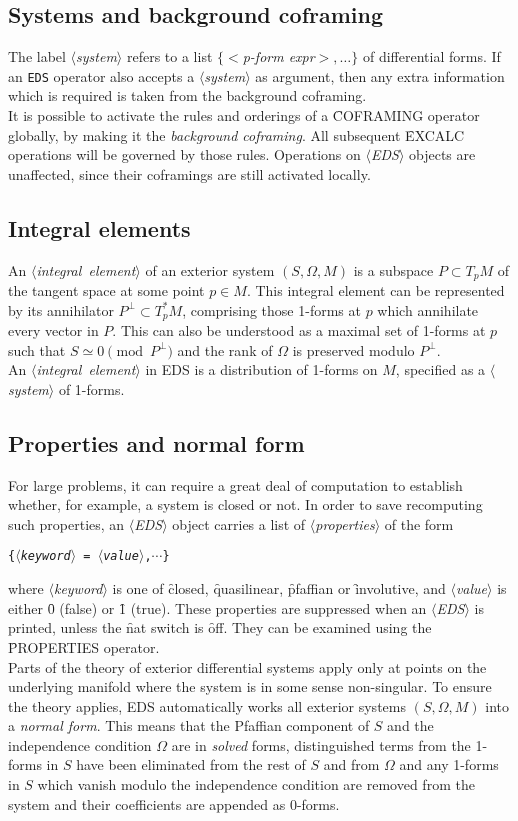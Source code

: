 \documentclass[11pt,letterpaper]{book}
\makeatletter
\newcommand{\underscore}{\_}
\newcommand{\ttindex}[1]{{\renewcommand{\_}{\protect\underscore}%
                          \index{#1@{\tt #1}}}}
\newcommand{\meta}[1]{\mbox{$\langle$\it#1\/$\rangle$}}
\makeatother
\begin{document}
\subsection{Systems and background coframing}
The label \meta{system} refers to a list $\{<${\it p-form expr}$>,\ldots\}$ of
differential forms. If an {\tt EDS} operator also accepts a \meta{system} as
argument, then any extra information which is required is taken from the
background coframing. \\
It is possible to activate the rules and orderings of a \f{COFRAMING} operator
globally, by making it the {\it background coframing}. All subsequent \f{EXCALC}
\ttindex{EXCALC} operations will be governed by those rules. Operations on
\meta{EDS} objects are unaffected, since their coframings are still activated
locally.

\subsection{Integral elements}
An \meta{integral element} of an exterior system $(S,\Omega,M)$ is a subspace
$P \subset T_pM$ of the tangent space at some point $p \in M$. This integral
element can be represented by its annihilator $P^\perp \subset T^*_pM$, comprising
those 1-forms at $p$ which annihilate every vector in $P$. This can also be understood
as a maximal set of 1-forms at $p$ such that $S \simeq 0 \pmod{P^\perp}$ and the
rank of $\Omega$ is preserved modulo $P^\perp$. \\
An \meta{integral element} in EDS is a distribution of 1-forms on $M$,
specified as a \meta{system} of 1-forms.

\subsection{Properties and normal form}
For large problems, it can require a great deal of computation to establish
whether, for example, a system is closed or not. In order to save
recomputing such properties, an \meta{EDS} object carries a list of
\meta{properties} of the form
\begin{list}{}
\item {\tt \{\meta{keyword} = \meta{value},$\cdots$\}}
\end{list}
where \meta{keyword} is one of \f{closed}, \f{quasilinear}, \f{pfaffian} or
\f{involutive}, and \meta{value} is either \f{0} (false) or \f{1}
(true). These properties are suppressed when an \meta{EDS} is printed,
unless the \f{nat} switch is \f{off}. They can be examined using the
\f{PROPERTIES} operator. \\
Parts of the theory of exterior differential systems apply only at points
on the underlying manifold where the system is in some sense
non-singular. To ensure the theory applies, EDS automatically works all
exterior systems $(S,\Omega,M)$ into a {\em normal form}. This means that
the Pfaffian component of $S$ and the independence condition $\Omega$ are
in {\it solved} forms, distinguished terms from the 1-forms in $S$ have
been eliminated from the rest of $S$ and from $\Omega$ and any 1-forms in
$S$ which vanish modulo the independence condition are removed from the
system and their coefficients are appended as 0-forms.
\end{document}
